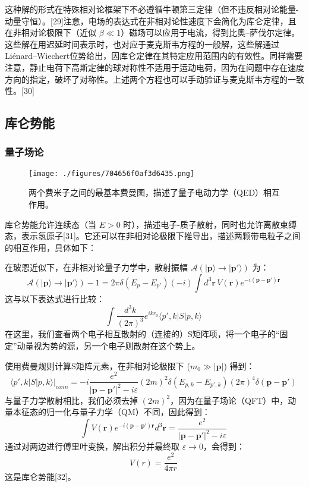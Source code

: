 这种解的形式在特殊相对论框架下不必遵循牛顿第三定律（但不违反相对论能量-动量守恒）。[29]注意，电场的表达式在非相对论性速度下会简化为库仑定律，且在非相对论极限下（近似 \( \beta \ll 1 \)）磁场可以应用于电流，得到比奥–萨伐尔定律。这些解在用迟延时间表示时，也对应于麦克斯韦方程的一般解，这些解通过Liénard–Wiechert位势给出，因库仑定律在其特定应用范围内的有效性。同样需要注意，静止电荷下高斯定律的球对称性不适用于运动电荷，因为在问题中存在速度方向的指定，破坏了对称性。上述两个方程也可以手动验证与麦克斯韦方程的一致性。[30]
\subsection{库仑势能}  
\subsubsection{量子场论}
\begin{figure}[ht]
\centering
\texttt{[image: ./figures/704656f0af3d6435.png]}
\caption{两个费米子之间的最基本费曼图，描述了量子电动力学（QED）相互作用。} \label{fig_KL_6}
\end{figure}
库仑势能允许连续态（当 \( E > 0 \) 时），描述电子-质子散射，同时也允许离散束缚态，表示氢原子[31]。它还可以在非相对论极限下推导出，描述两颗带电粒子之间的相互作用，具体如下：

在玻恩近似下，在非相对论量子力学中，散射振幅 \({\mathcal {A}}(|\mathbf {p} \rangle \to |\mathbf {p'} \rangle)\) 为：
\[
{\mathcal {A}}(|\mathbf {p} \rangle \to |\mathbf {p'} \rangle ) - 1 = 2\pi \delta (E_{p}-E_{p'})(-i)\int d^{3}\mathbf {r} \,V(\mathbf {r} )e^{-i(\mathbf {p} -\mathbf {p'} )\mathbf {r}}~
\]
这与以下表达式进行比较：
\[
\int \frac{d^{3}k}{(2\pi )^{3}} e^{ikr_{0}} \langle p',k|S|p,k\rangle~
\]
在这里，我们查看两个电子相互散射的（连接的）S矩阵项，将一个电子的“固定”动量视为势的源，另一个电子则散射在这个势上。

使用费曼规则计算S矩阵元素，在非相对论极限下 (\( m_0 \gg |\mathbf {p} | \)) 得到：
\[
\langle p',k|S|p,k\rangle |_{conn} = -i{\frac {e^{2}}{|\mathbf {p} -\mathbf {p} '|^{2}-i\varepsilon }}(2m)^{2}\delta (E_{p,k}-E_{p',k})(2\pi )^{4}\delta (\mathbf {p} -\mathbf {p'} )~
\]
与量子力学散射相比，我们必须去掉 \((2m)^2\)，因为在量子场论（QFT）中，动量本征态的归一化与量子力学（QM）不同，因此得到：
\[
\int V(\mathbf {r} ) e^{-i(\mathbf {p} -\mathbf {p} ')\mathbf {r}} d^{3}\mathbf {r} = \frac{e^{2}}{|\mathbf {p} -\mathbf {p} '|^{2}-i\varepsilon}~
\]
通过对两边进行傅里叶变换，解出积分并最终取 \(\varepsilon \to 0\)，会得到：
\[
V(r) = \frac{e^{2}}{4\pi r}~
\]
这是库仑势能[32]。

